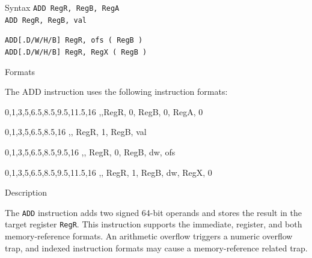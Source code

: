 %
%
\pagebreak
{}

\begin{iPageDescEntry}{Syntax} 
  \texttt{ADD RegR, RegB, RegA} \\
  \texttt{ADD RegR, RegB, val}
  
  \texttt{ADD[.D/W/H/B] RegR, ofs ( RegB )} \\
  \texttt{ADD[.D/W/H/B] RegR, RegX ( RegB )}
\end{iPageDescEntry}

\begin{iPageDescEntry}{Formats}

The ADD instruction uses the following instruction formats: \\
	
\begin{flushleft}	

	\drawInstrFormat
  	{0,1,3,5,6.5,8.5,9.5,11.5,16}
  	{\OpCodeGrpALU,\OpCodeADD,RegR, 0, RegB, 0, RegA, 0}
	
	\drawInstrFormat
  	{0,1,3,5,6.5,8.5,16}
  	{\OpCodeGrpALU,\OpCodeADD, RegR, 1, RegB, val}

	\drawInstrFormat
  	{0,1,3,5,6.5,8.5,9.5,16}
  	{\OpCodeGrpMEM,\OpCodeADD, RegR, 0, RegB, dw, ofs}
 
	\drawInstrFormat
  	{0,1,3,5,6.5,8.5,9.5,11.5,16}
  	{\OpCodeGrpMEM,\OpCodeADD, RegR, 1, RegB, dw, RegX, 0}

\end{flushleft}  

\end{iPageDescEntry}

\begin{iPageDescEntry}{Description}

The \texttt{ADD} instruction adds two signed 64-bit operands and stores the result in the target register \texttt{RegR}. This instruction supports the immediate, register, and both memory-reference formats. An arithmetic overflow triggers a numeric overflow trap, and indexed instruction formats may cause a memory-reference related trap.
\end{iPageDescEntry}

